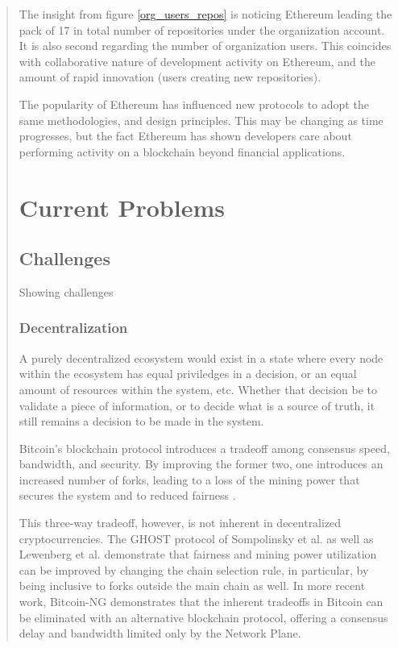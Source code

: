 \documentclass[12pt, titlepage, twocolumn]{report}
\begin{document}
\begin{quotation}
The insight from figure \ref{org_users_repos} is noticing Ethereum leading the pack of 17 in total number of repositories under the organization account. It is also second regarding the number of organization users. This coincides with collaborative nature of development activity on Ethereum, and the amount of rapid innovation (users creating new repositories). 

The popularity of Ethereum has influenced new protocols to adopt the same methodologies, and design principles. This may be changing as time progresses, but the fact Ethereum has shown developers care about performing activity on a blockchain beyond financial applications. 


\chapter{Current Problems}

\section{Challenges}
Showing challenges

\subsection{Decentralization}
A purely decentralized ecosystem would exist in a state where every node within the ecosystem has equal priviledges in a decision, or an equal amount of resources within the system, etc. Whether that decision be to validate a piece of information, or to decide what is a source of truth, it still remains a decision to be made in the system.

Bitcoin's blockchain protocol introduces a tradeoff among consensus speed, bandwidth, and security. By improving the former two, one introduces an increased number of forks, leading to a loss of the mining power that secures the system and to reduced fairness \cite{scalable_blockchain_tech_report}.

This three-way tradeoff, however, is not inherent in decentralized cryptocurrencies. The GHOST protocol \cite{secure_high_rate_transaction} of Sompolinsky et al. as well as Lewenberg et al. \cite{inclusive_block} demonstrate that fairness and mining power utilization can be improved by changing the chain selection rule, in particular, by being inclusive to forks outside the main chain as well. In more recent work, Bitcoin-NG \cite{secure_high_rate_transaction} demonstrates that the inherent tradeoffs in Bitcoin can be eliminated with an alternative blockchain protocol, offering a consensus delay and bandwidth limited only by the Network Plane.



\end{quotation}
\end{document}
